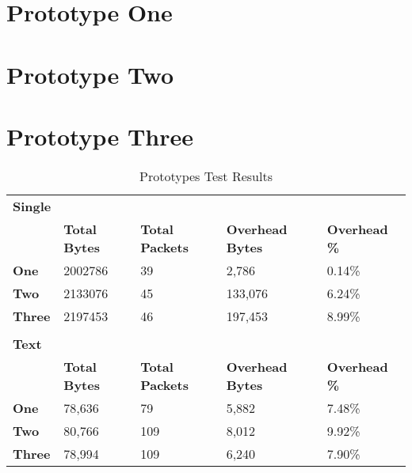 \section{Prototype One}

\section{Prototype Two}

\section{Prototype Three}

\begin{table}[h!]
	\caption{Prototypes Test Results}
	\label{tab:prototypes-test-results}
	\centering
	\begin{tabular}{l l l l l}
		\textbf{Single}     &                      &                        &                         &                      \\
		\textbf{}           & \textbf{Total Bytes} & \textbf{Total Packets} & \textbf{Overhead Bytes} & \textbf{Overhead \%} \\
		\hline
		\textbf{One}        & 2002786              & 39                     & 2,786                   & 0.14\%               \\
		\hline
		\textbf{Two}        & 2133076              & 45                     & 133,076                 & 6.24\%               \\
		\hline
		\textbf{Three}      & 2197453              & 46                     & 197,453                 & 8.99\%               \\
		\hline
		                    &                      &                        &                         &                      \\
		\textbf{Text}       &                      &                        &                         &                      \\
		\textbf{}           & \textbf{Total Bytes} & \textbf{Total Packets} & \textbf{Overhead Bytes} & \textbf{Overhead \%} \\
		\hline
		\textbf{One}        & 78,636               & 79                     & 5,882                   & 7.48\%               \\
		\hline
		\textbf{Two}        & 80,766               & 109                    & 8,012                   & 9.92\%               \\
		\hline
		\textbf{Three}      & 78,994               & 109                    & 6,240                   & 7.90\%               \\

\end{tabular}
\end{table}
